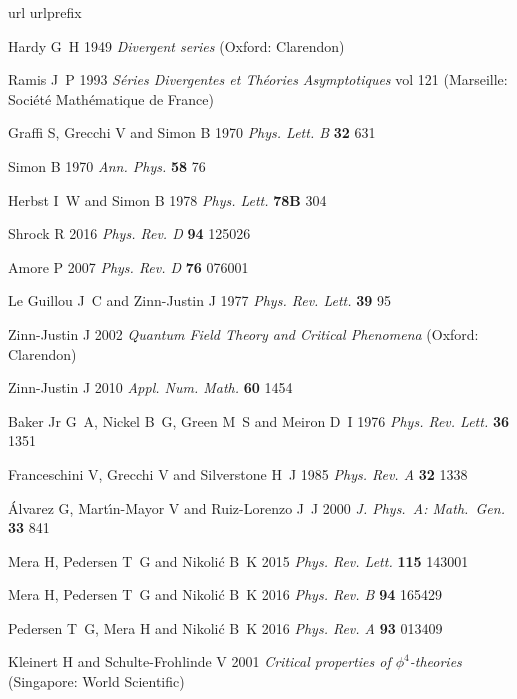 \documentclass[12pt]{iopart}
\begin{document}
\begin{thebibliography}{10}
\expandafter\ifx\csname url\endcsname\relax
  \def\url#1{{\tt #1}}\fi
\expandafter\ifx\csname urlprefix\endcsname\relax\def\urlprefix{URL }\fi
\providecommand{\eprint}[2][]{\url{#2}}

Hardy G~H 1949 {\em Divergent series\/} (Oxford: Clarendon)

Ramis J~P 1993 {\em S\'eries Divergentes et Th{\'e}ories Asymptotiques\/} vol
  121 (Marseille: Soci\'et\'e Math\'ematique de France)

Graffi S, Grecchi V and Simon B 1970 {\em Phys. Lett. B\/} {\bf 32} 631

Simon B 1970 {\em Ann. Phys.\/} {\bf 58} 76

Herbst I~W and Simon B 1978 {\em Phys. Lett.\/} {\bf 78B} 304

Shrock R 2016 {\em Phys. Rev. D\/} {\bf 94} 125026

Amore P 2007 {\em Phys. Rev. D\/} {\bf 76} 076001

{Le Guillou} J~C and Zinn-Justin J 1977 {\em Phys. Rev. Lett.\/} {\bf 39} 95

Zinn-Justin J 2002 {\em Quantum Field Theory and Critical Phenomena\/} (Oxford: Clarendon)

Zinn-Justin J 2010 {\em Appl. Num. Math.\/} {\bf 60} 1454

{Baker Jr} G~A, Nickel B~G, Green M~S and Meiron D~I 1976 {\em Phys. Rev.
  Lett.\/} {\bf 36} 1351

Franceschini V, Grecchi V and Silverstone H~J 1985 {\em Phys. Rev. A\/} {\bf
  32} 1338

\'Alvarez G, Mart\'{\i}n-Mayor V and Ruiz-Lorenzo J~J 2000 {\em J. Phys.\ A:
  Math.\ Gen.\/} {\bf 33} 841

Mera H, Pedersen T~G and Nikoli\'c B~K 2015 {\em Phys. Rev. Lett.\/} {\bf 115}
  143001

Mera H, Pedersen T~G and Nikoli\'c B~K 2016 {\em Phys. Rev. B\/} {\bf 94}
  165429

Pedersen T~G, Mera H and Nikoli\'c B~K 2016 {\em Phys. Rev. A\/} {\bf 93}
  013409

Kleinert H and Schulte-Frohlinde V 2001 {\em Critical properties of
  $\phi^4$-theories\/} (Singapore: World Scientific)


\end{thebibliography}
\end{document}
